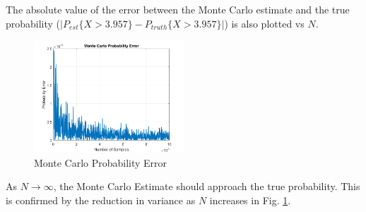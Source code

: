 \documentclass[conference]{IEEEtran}
\begin{document}
The absolute value of the error between the Monte Carlo estimate and the true probability ($|P_{est}\{X > 3.957\} - P_{truth}\{X > 3.957\}|$) is also plotted vs $N$.
\begin{figure}[H]
\centerline{\includegraphics[width=0.5\textwidth]{Monte_Carlo_Error.png}}
\caption{Monte Carlo Probability Error}
\label{Monte Carlo Perr}
\end{figure}
As $N\rightarrow\infty$, the Monte Carlo Estimate should approach the true probability. This is confirmed by the reduction in variance as $N$ increases in Fig. \ref{Monte Carlo Perr}.
\end{document}
